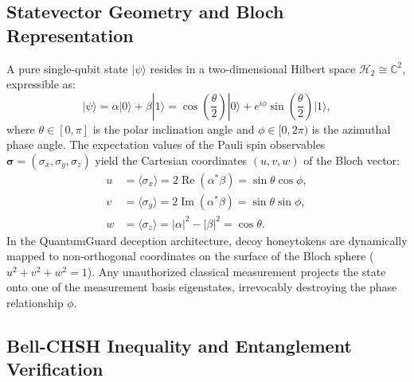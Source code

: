 \documentclass[pdflatex,sn-mathphys-num]{sn-jnl}
\theoremstyle{thmstyleone}
\theoremstyle{thmstyletwo}
\theoremstyle{thmstylethree}
\begin{document}
\subsection{Statevector Geometry and Bloch Representation}

A pure single-qubit state $|\psi\rangle$ resides in a two-dimensional Hilbert space $\mathcal{H}_2 \cong \mathbb{C}^2$, expressible as:
\begin{equation}
  |\psi\rangle = \alpha |0\rangle + \beta |1\rangle = \cos\left(\frac{\theta}{2}\right) |0\rangle + e^{i\phi}\sin\left(\frac{\theta}{2}\right) |1\rangle,
  \label{eq:bloch_state}
\end{equation}
where $\theta \in [0, \pi]$ is the polar inclination angle and $\phi \in [0, 2\pi)$ is the azimuthal phase angle. The expectation values of the Pauli spin observables $\boldsymbol{\sigma} = (\sigma_x, \sigma_y, \sigma_z)$ yield the Cartesian coordinates $(u, v, w)$ of the Bloch vector:
\begin{align}
  u &= \langle \sigma_x \rangle = 2\operatorname{Re}(\alpha^*\beta) = \sin\theta \cos\phi, \label{eq:u} \\
  v &= \langle \sigma_y \rangle = 2\operatorname{Im}(\alpha^*\beta) = \sin\theta \sin\phi, \label{eq:v} \\
  w &= \langle \sigma_z \rangle = |\alpha|^2 - |\beta|^2 = \cos\theta. \label{eq:w}
\end{align}
In the QuantumGuard deception architecture, decoy honeytokens are dynamically mapped to non-orthogonal coordinates on the surface of the Bloch sphere ($u^2 + v^2 + w^2 = 1$). Any unauthorized classical measurement projects the state onto one of the measurement basis eigenstates, irrevocably destroying the phase relationship $\phi$.

\subsection{Bell-CHSH Inequality and Entanglement Verification}
\end{document}
